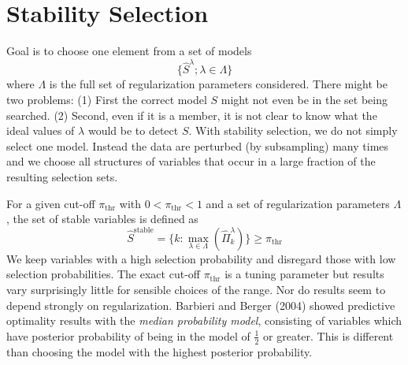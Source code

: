 \section{Stability Selection}
Goal is to choose one element from a set of models
\begin{equation}
    \{\hat{S}^{\lambda};\lambda\in\Lambda\}
\end{equation}
where $\Lambda$ is the full set of regularization parameters considered. There might be two problems: (1) First the correct model $S$ might not even be in the set being searched. (2) Second, even if it is a member, it is not clear to know what the ideal values of $\lambda$ would be to detect $S$. With stability selection, we do not simply select one model. Instead the data are perturbed (by subsampling) many times and we choose all structures of variables that occur in a large fraction of the resulting selection sets. 

For a given cut-off $\pi_{\text{thr}}$ with $0 < \pi_{\text{thr}} < 1$ and a set of regularization parameters $\Lambda$, the set of stable variables is defined as 
\begin{equation}
    \hat{S}^{\text{stable}} = \{k:\max\limits_{\lambda\in\Lambda}(\hat{\Pi}_k^{\lambda})\} \geq \pi_{\text{thr}} 
\end{equation}
We keep variables with a high selection probability and disregard those with low selection probabilities. The exact cut-off $\pi_{\text{thr}}$ is a tuning parameter but results vary surprisingly little for sensible choices of the range. Nor do results seem to depend strongly on regularization. Barbieri and Berger (2004) showed predictive optimality results with the \textit{median probability model}, consisting of variables which have posterior probability of being in the model of $\frac{1}{2}$ or greater. This is different than choosing the model with the highest posterior probability. 

